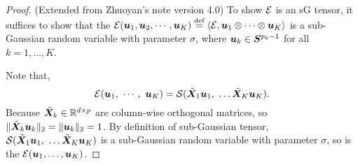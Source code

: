 \documentclass[11pt]{article}
\theoremstyle{plain}
\theoremstyle{definition}
\begin{document}
\begin{proof} (Extended from Zhuoyan's note version 4.0)
To show $\mathcal{E}$ is an sG tensor, it suffices to show that the $\mathcal{E}(\bm{u}_1, \bm{u}_2, \cdots, \bm{u}_K)\stackrel{\text{def}}{=}\langle\mathcal{E}, \bm{u}_1\otimes \cdots\otimes \bm{u}_K \rangle$ is a sub-Gaussian random variable with parameter $\sigma$, where $\bm{u}_k\in\bm S^{p_k-1}$ for all $k=1,\ldots,K$.

Note that, 
\[
\mathcal{E}(\bm{u}_1,\ \cdots,\ \bm{u}_K )=\mathcal{S}(\tilde {\bm X}_1\bm{u}_1,\ \ldots \tilde {\bm X}_K\bm{u}_K).
\]
Because $\tilde {\bm X}_k\in\mathbb{R}^{d\times p}$ are column-wise orthogonal matrices, so $\lVert\tilde {\bm X}_k\bm{u}_k\rVert_2=\lVert\bm{u}_k\rVert_2=1$. By definition of sub-Gaussian tensor, $\tS(\tilde \mX_1\bmu_1,\ \ldots \tilde \mX_K\bmu_K)$ is a sub-Gaussian random variable with parameter $\sigma$, so is the $\mathcal{E}(\bm{u}_1,\ldots,\bm{u}_K)$. 
\end{proof}
\end{document}
